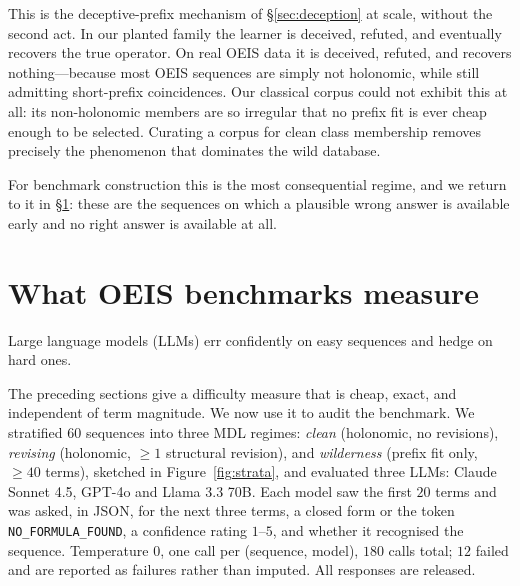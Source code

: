 \documentclass[10pt]{article}
\theoremstyle{definition}
\theoremstyle{plain}
\begin{document}
This is the deceptive-prefix mechanism of \S\ref{sec:deception} at scale,
without the second act. In our planted family the learner is deceived, refuted,
and eventually recovers the true operator. On real OEIS data it is deceived,
refuted, and recovers nothing---because most OEIS sequences are simply not
holonomic, while still admitting short-prefix coincidences. Our classical
corpus could not exhibit this at all: its non-holonomic members are so
irregular that no prefix fit is ever cheap enough to be selected. Curating a
corpus for clean class membership removes precisely the phenomenon that
dominates the wild database.

For benchmark construction this is the most consequential regime, and we return
to it in \S\ref{sec:llm}: these are the sequences on which a plausible wrong
answer is available early and no right answer is available at all.

\section{What OEIS benchmarks measure}
\label{sec:llm}

Large language models (LLMs) err confidently on easy sequences and hedge on
hard ones.

The preceding sections give a difficulty measure that is cheap, exact, and
independent of term magnitude. We now use it to audit the benchmark. We
stratified $60$ sequences into three MDL regimes: \emph{clean} (holonomic, no
revisions), \emph{revising} (holonomic, $\ge 1$ structural revision), and
\emph{wilderness} (prefix fit only, $\ge 40$ terms), sketched in
Figure~\ref{fig:strata}, and evaluated three
LLMs: Claude Sonnet 4.5, GPT-4o and Llama 3.3 70B. Each model saw
the first $20$ terms and was asked, in JSON, for the next three terms, a closed
form or the token \texttt{NO\_FORMULA\_FOUND}, a confidence rating $1$--$5$, and
whether it recognised the sequence. Temperature $0$, one call per
(sequence, model), $180$ calls total; $12$ failed and are reported as failures
rather than imputed. All responses are released.
\end{document}
